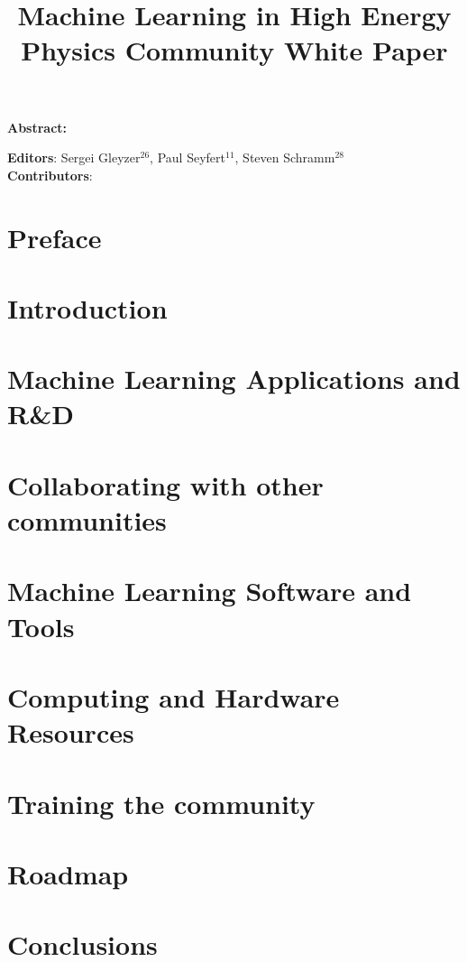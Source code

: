 \documentclass{article}
\begin{document}
\title{Machine Learning in High Energy Physics Community White Paper}

\maketitle

\setlength\parindent{0pt}
\textbf{Abstract:}

\vskip 1cm
\textbf{Editors}: Sergei Gleyzer$^{26}$, Paul Seyfert$^{11}$, Steven Schramm$^{28}$\\
\newline
\textbf{Contributors}:


\tableofcontents
\clearpage

\section{Preface}
\label{sec:preface}


\section{Introduction}
\label{sec:introduction}


\section{Machine Learning Applications and R\&D}
\label{sec:applications}


\section{Collaborating with other communities}
\label{sec:collaboration}


\section{Machine Learning Software and Tools}
\label{sec:software}


\section{Computing and Hardware Resources}
\label{sec:resources}


\section{Training the community}
\label{sec:training}


\section{Roadmap}
\label{sec:roadmap}


\section{Conclusions}
\label{sec:conclusions}


\appendix

\clearpage

\printbibliography[title={References}]
\end{document}
